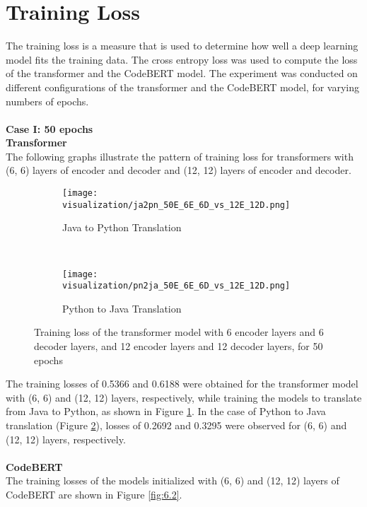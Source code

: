 \section{Training Loss}
The training loss is a measure that is used to determine how well a deep learning model fits the training data. The cross entropy loss was used to compute the loss of the transformer and the CodeBERT model. The experiment was conducted on different configurations of the transformer and the CodeBERT model, for varying numbers of epochs.
\\\\
\textbf{Case I: 50 epochs} \\
\textbf{Transformer} \\
The following graphs illustrate the pattern of training loss for transformers with (6, 6) layers of encoder and decoder and (12, 12) layers of encoder and decoder.
\begin{figure}[H]
\centering
  \begin{subfigure}[h]{0.45\textwidth}
    \texttt{[image: visualization/ja2pn\_50E\_6E\_6D\_vs\_12E\_12D.png]}
    \caption{Java to Python Translation}
    \label{fig:6.1_a}
  \end{subfigure}
  ~
  \begin{subfigure}[h]{0.45\textwidth}
    \texttt{[image: visualization/pn2ja\_50E\_6E\_6D\_vs\_12E\_12D.png]}
    \caption{Python to Java Translation}
    \label{fig:6.1_b}
  \end{subfigure}
\caption[Training loss of the transformer model with 6 encoder layers and 6 decoder layers, and 12 encoder layers and 12 decoder layers, for 50 epochs]{Training loss of the transformer model with 6 encoder layers and 6 decoder layers, and 12 encoder layers and 12 decoder layers, for 50 epochs}
\label{fig:6.1}
\end{figure}
\noindent
The training losses of 0.5366 and 0.6188 were obtained for the transformer model with (6, 6) and (12, 12) layers, respectively, while training the models to translate from Java to Python, as shown in Figure \ref{fig:6.1_a}. In the case of Python to Java translation (Figure \ref{fig:6.1_b}), losses of 0.2692 and 0.3295 were observed for (6, 6) and (12, 12) layers, respectively.
\\\\
\textbf{CodeBERT} \\
The training losses of the models initialized with (6, 6) and (12, 12) layers of CodeBERT are shown in Figure \ref{fig:6.2}.
